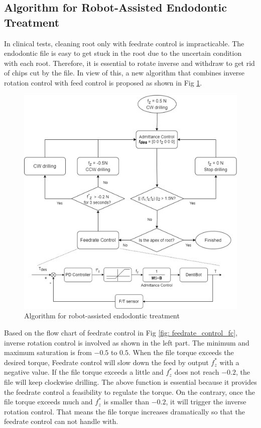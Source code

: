 \subsection{Algorithm for Robot-Assisted Endodontic Treatment}
\hspace*{6mm}In clinical tests, cleaning root only with feedrate control is impracticable. The endodontic file is easy to get stuck in the root due to the uncertain condition with each root. Therefore, it is essential to rotate inverse and withdraw to get rid of chips cut by the file. In view of this, a new algorithm that combines inverse rotation control with feed control is proposed as shown in Fig \ref{fig: complete_flowchart}.
\begin{figure}[htbp]
\begin{center}
\includegraphics[width=1\linewidth]{Images/algorithm.png}
\end{center}
\caption{
Algorithm for robot-assisted endodontic treatment
}\label{fig: complete_flowchart}
\end{figure}
\par	
Based on the flow chart of feedrate control in Fig \ref{fig: feedrate_control_fc}, inverse rotation control is involved as shown in the left part. The minimum and maximum saturation is from $-0.5$ to $0.5$. When the file torque exceeds the desired torque, Feedrate control will slow down the feed by output $f^*_z$ with a negative value. If  the file torque exceeds a little and $f^*_z$ does not reach $-0.2$, the file will keep clockwise drilling. The above function is essential because it provides the feedrate control a feasibility to regulate the torque.  On the contrary, once the file torque exceeds much and  $f^*_z$  is smaller than $-0.2$, it will trigger the inverse rotation control. That means the file torque increases dramatically so that the feedrate control can not handle with. 

